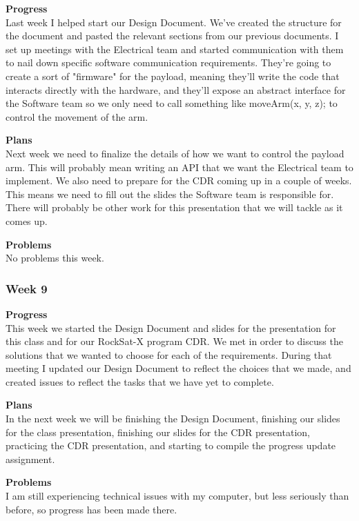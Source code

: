 \textbf{Progress} \\
Last week I helped start our Design Document. We've created the structure for the document and pasted the relevant sections from our previous documents. I set up meetings with the Electrical team and started communication with them to nail down specific software communication requirements. They're going to create a sort of "firmware" for the \gls{payload}, meaning they'll write the code that interacts directly with the hardware, and they'll expose an abstract interface for the Software team so we only need to call something like moveArm(x, y, z); to control the movement of the arm.

\textbf{Plans} \\
Next week we need to finalize the details of how we want to control the \gls{payload} arm. This will probably mean writing an API that we want the Electrical team to implement. We also need to prepare for the CDR coming up in a couple of weeks. This means we need to fill out the slides the Software team is responsible for. There will probably be other work for this presentation that we will tackle as it comes up.

\textbf{Problems} \\
No problems this week.

\subsubsection{Week 9}
\textbf{Progress} \\ 
This week we started the Design Document and slides for the presentation for this class and for our RockSat-X program CDR. We met in order to discuss the solutions that we wanted to choose for each of the requirements. During that meeting I updated our Design Document to reflect the choices that we made, and created issues to reflect the tasks that we have yet to complete.

\textbf{Plans} \\ 
In the next week we will be finishing the Design Document, finishing our slides for the class presentation, finishing our slides for the CDR presentation, practicing the CDR presentation, and starting to compile the progress update assignment.

\textbf{Problems} \\ 
I am still experiencing technical issues with my computer, but less seriously than before, so progress has been made there.

